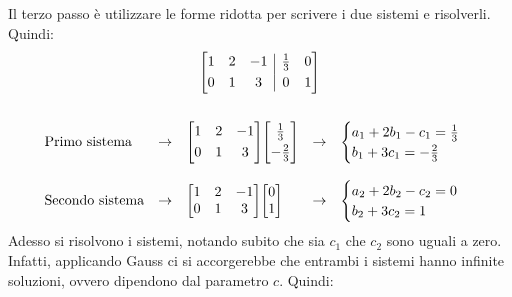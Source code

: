 \documentclass[a4paper]{article}
\makeatletter
\newenvironment{rowequmatbra}[1]{\left[\array{@{}#1@{}}}{\endarray\right]}
\makeatother
\begin{document}
	Il \textcolor{Red3}{terzo passo} è utilizzare le forme ridotta per scrivere i due sistemi e risolverli. Quindi:
	\begin{gather*}
		\begin{rowequmatbra}{ccc|cc}
			1 & 2 & -1 & \frac{1}{3} & 0 \\ [0.3em]
			0 & 1 &  3 &           0 & 1
		\end{rowequmatbra} \\
		\\
		\begin{array}{lllll}
			\text{Primo sistema}	& \rightarrow & \begin{rowequmatbra}{ccc}
				1 & 2 & -1 \\ [0.3em]
				0 & 1 &  3
			\end{rowequmatbra} \begin{rowequmatbra}{c}
				\frac{1}{3}  \\ [0.3em]
				-\frac{2}{3}
			\end{rowequmatbra} & \rightarrow & \begin{cases}
				a_{1} + 2b_{1} - c_{1} = \frac{1}{3} \\
				b_{1} + 3c_{1} = -\frac{2}{3}
			\end{cases} \\
			&&&& \\
			\text{Secondo sistema}	& \rightarrow & \begin{rowequmatbra}{ccc}
				1 & 2 & -1 \\
				0 & 1 &  3
			\end{rowequmatbra} \begin{rowequmatbra}{c}
				0 \\
				1
			\end{rowequmatbra} & \rightarrow & \begin{cases}
				a_{2} + 2b_{2} - c_{2} = 0 \\
				b_{2} + 3c_{2} = 1
			\end{cases}
		\end{array}
	\end{gather*}
	Adesso si risolvono i sistemi, notando subito che sia $c_{1}$ che $c_{2}$ sono uguali a zero. Infatti, applicando Gauss ci si accorgerebbe che entrambi i sistemi hanno infinite soluzioni, ovvero dipendono dal parametro $c$. Quindi:
\end{document}
